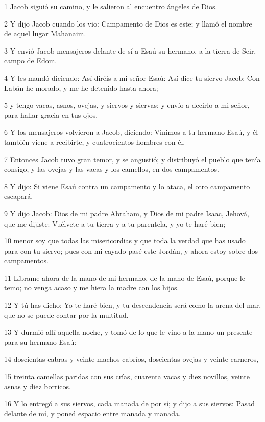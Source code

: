 \par 1 Jacob siguió su camino, y le salieron al encuentro ángeles de Dios.
\par 2 Y dijo Jacob cuando los vio: Campamento de Dios es este; y llamó el nombre de aquel lugar Mahanaim.
\par 3 Y envió Jacob mensajeros delante de sí a Esaú su hermano, a la tierra de Seir, campo de Edom.
\par 4 Y les mandó diciendo: Así diréis a mi señor Esaú: Así dice tu siervo Jacob: Con Labán he morado, y me he detenido hasta ahora;
\par 5 y tengo vacas, asnos, ovejas, y siervos y siervas; y envío a decirlo a mi señor, para hallar gracia en tus ojos.
\par 6 Y los mensajeros volvieron a Jacob, diciendo: Vinimos a tu hermano Esaú, y él también viene a recibirte, y cuatrocientos hombres con él.
\par 7 Entonces Jacob tuvo gran temor, y se angustió; y distribuyó el pueblo que tenía consigo, y las ovejas y las vacas y los camellos, en dos campamentos.
\par 8 Y dijo: Si viene Esaú contra un campamento y lo ataca, el otro campamento escapará.
\par 9 Y dijo Jacob: Dios de mi padre Abraham, y Dios de mi padre Isaac, Jehová, que me dijiste: Vuélvete a tu tierra y a tu parentela, y yo te haré bien;
\par 10 menor soy que todas las misericordias y que toda la verdad que has usado para con tu siervo; pues con mi cayado pasé este Jordán, y ahora estoy sobre dos campamentos.
\par 11 Líbrame ahora de la mano de mi hermano, de la mano de Esaú, porque le temo; no venga acaso y me hiera la madre con los hijos.
\par 12 Y tú has dicho: Yo te haré bien, y tu descendencia será como la arena del mar, que no se puede contar por la multitud.
\par 13 Y durmió allí aquella noche, y tomó de lo que le vino a la mano un presente para su hermano Esaú:
\par 14 doscientas cabras y veinte machos cabríos, doscientas ovejas y veinte carneros,
\par 15 treinta camellas paridas con sus crías, cuarenta vacas y diez novillos, veinte asnas y diez borricos.
\par 16 Y lo entregó a sus siervos, cada manada de por sí; y dijo a sus siervos: Pasad delante de mí, y poned espacio entre manada y manada.
